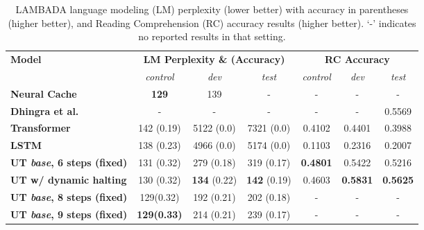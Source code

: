 \begin{table}
\centering
    \begin{adjustbox}{max width=\textwidth}
    \begin{tabular}{lcccccc}
    \toprule
    \multirow{2}{*}{ \bf Model } & \multicolumn{3}{c}{\bf LM Perplexity \& (Accuracy) } & \multicolumn{3}{c}{\bf RC Accuracy } \\ \cmidrule(l{2pt}r{2pt}){2-4} \cmidrule(l{2pt}r{2pt}){5-7}
    & \textit{control} & \textit{dev} & \textit{test} & \textit{control} & \textit{dev} & \textit{test} \\ \midrule
    \bf Neural Cache~\citep{grave2016improving} & {\bf 129} & 139 & - & - & - & - \\ 
    \bf Dhingra et al.~\cite{dhingra2018neural} & - & - & - & - & - & 0.5569 \\ \midrule
    \bf Transformer & 142 (0.19) & 5122 (0.0) & 7321 (0.0) & 
    0.4102 & 0.4401 & 0.3988 \\
    \bf LSTM & 138 (0.23) & 4966 (0.0) & 5174 (0.0) & 0.1103 & 0.2316 & 0.2007 \\
    \bf UT \emph{base}, 6 steps (fixed) & 131 (0.32) & 279 (0.18) & 319 (0.17) & {\bf 0.4801} & 0.5422 & 0.5216 \\
    \bf UT w/ dynamic halting & 130 (0.32) & {\bf 134} (0.22) & {\bf 142} (0.19) & 0.4603 & {\bf 0.5831} & {\bf 0.5625} \\ \midrule
    \bf UT \emph{base}, 8 steps (fixed) & 129(0.32) & 192 (0.21) & 202 (0.18) & - & - & - \\
    \bf UT \emph{base}, 9 steps (fixed) & \textbf{129(0.33)} & 214 (0.21) & 239 (0.17) & - & - & - \\
 \bottomrule
    \end{tabular}
    \end{adjustbox}
    \caption{LAMBADA language modeling (LM) perplexity (lower better) with accuracy in parentheses (higher better), and Reading Comprehension (RC) accuracy results (higher better). `-' indicates no reported results in that setting.}
    \label{tab:lambada}
\end{table}